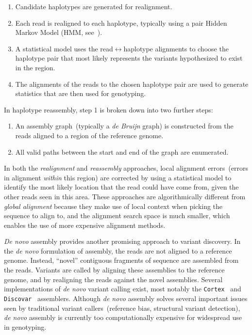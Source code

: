 \documentclass[masters]{ucbthesis}
\begin{document}
\begin{enumerate}
\item Candidate haplotypes are generated for realignment.
\item Each read is realigned to each haplotype, typically using a pair Hidden Markov Model (HMM,
see~\cite{durbin98}).
\item A statistical model uses the read$\leftrightarrow$haplotype alignments to choose the haplotype pair
that most likely represents the variants hypothesized to exist in the region.
\item The alignments of the reads to the chosen haplotype pair are used to generate statistics that are
then used for genotyping.
\end{enumerate}

In haplotype reassembly, step 1 is broken down into two further steps:

\begin{enumerate}
\item An assembly graph~(typically a \emph{de Bruijn} graph) is constructed from the reads aligned to a region of the reference genome.
\item All valid paths between the start and end of the graph are enumerated.
\end{enumerate}

In both the \emph{realignment} and \emph{reassembly} approaches, local alignment errors~(errors in
alignment \emph{within} this region) are corrected by using a statistical model to identify the most likely
location that the read could have come from, given the other reads seen in this area. These approaches
are algorithmically different from \emph{global alignment} because they make use of local context when
picking the sequence to align to, and the alignment search space is much smaller, which enables the use
of more expensive alignment methods.

\emph{De novo} assembly provides another promising approach to variant discovery. In the \emph{de
novo} formulation of assembly, the reads are not aligned to a reference genome. Instead, ``novel''
contiguous fragments of sequence are assembled from the reads. Variants are called by aligning these
assemblies to the reference genome, and by realigning the reads against the novel assemblies. Several
implementations of \emph{de novo} variant calling exist, most notably the \texttt{Cortex}~\cite{iqbal12}
and \texttt{Discovar}~\cite{weisenfeld14} assemblers. Although \emph{de novo} assembly solves
several important issues seen by traditional variant callers~(reference bias, structural variant detection),
\emph{de novo} assembly is currently too computationally expensive for widespread use in genotyping.
\end{document}
